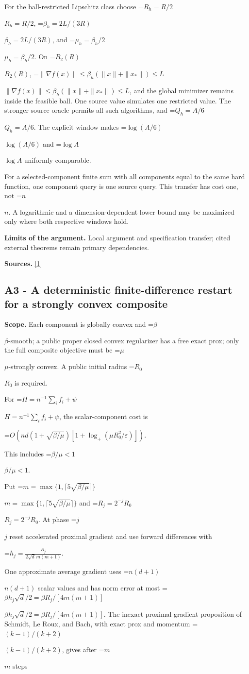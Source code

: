 \documentclass[10pt,a4paper]{article}
\newcommand{\AtlasMath}[1]{\par\begingroup\centering\setbox0=\hbox{$\displaystyle #1$}\ifdim\wd0>1.4\linewidth\typeout{ATLAS WIDE FORMULA: \the\wd0}\fi\ifdim\wd0>\linewidth\resizebox{\linewidth}{!}{\box0}\else\box0\fi\par\endgroup}
\newcommand{\AtlasInlineMath}[1]{\begingroup\setbox0=\hbox{$#1$}\ifdim\wd0>.4\linewidth\endgroup\AtlasMath{#1}\else\endgroup$#1$\fi}
\begin{document}
For the ball-restricted Lipschitz class choose \AtlasInlineMath{R_h=R/2}, \AtlasInlineMath{\beta_h=2L/(3R)}, and \AtlasInlineMath{\mu_h=\beta_h/2}. On \AtlasInlineMath{B_2(R)}, \AtlasInlineMath{\|\nabla f(x)\|\le\beta_h(\|x\|+\|x_*\|)\le L}, and the global minimizer remains inside the feasible ball. One source value simulates one restricted value. The stronger source oracle permits all such algorithms, and \AtlasInlineMath{Q_h=A/6}. The explicit window makes \AtlasInlineMath{\log(A/6)} and \AtlasInlineMath{\log A} uniformly comparable.

For a selected-component finite sum with all components equal to the same hard function, one component query is one source query. This transfer has cost one, not \AtlasInlineMath{n}. A logarithmic and a dimension-dependent lower bound may be maximized only where both respective windows hold.

\textbf{Limits of the argument.} Local argument and specification transfer; cited external theorems remain primary dependencies.

\textbf{Sources.} \href{https://arxiv.org/html/2610.00345v1}{[1]}

\subsection{A3 - A deterministic finite-difference restart for a strongly convex composite}
\textbf{Scope.} Each component is globally convex and \AtlasInlineMath{\beta}-smooth; a public proper closed convex regularizer has a free exact prox; only the full composite objective must be \AtlasInlineMath{\mu}-strongly convex. A public initial radius \AtlasInlineMath{R_0} is required.

For \AtlasInlineMath{H=n^{-1}\sum_i f_i+\psi}, the scalar-component cost is

\AtlasMath{O\!\left(nd(1+\sqrt{\beta/\mu})[1+\log_+(\mu R_0^2/\varepsilon)]\right).}

This includes \AtlasInlineMath{\beta/\mu<1}.

Put \AtlasInlineMath{m=\max\{1,\lceil5\sqrt{\beta/\mu}\rceil\}} and \AtlasInlineMath{R_j=2^{-j}R_0}. At phase \AtlasInlineMath{j} reset accelerated proximal gradient and use forward differences with

\AtlasMath{h_j=\frac{R_j}{2\sqrt d\,m(m+1)}.}

One approximate average gradient uses \AtlasInlineMath{n(d+1)} scalar values and has norm error at most \AtlasInlineMath{\beta h_j\sqrt d/2=\beta R_j/[4m(m+1)]}. The inexact proximal-gradient proposition of Schmidt, Le Roux, and Bach, with exact prox and momentum \AtlasInlineMath{(k-1)/(k+2)}, gives after \AtlasInlineMath{m} steps
\end{document}

